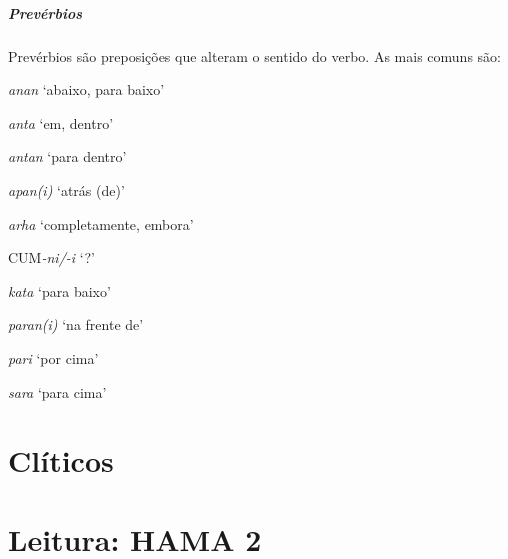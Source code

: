 \paragraph{Prevérbios}
Prevérbios são preposições que alteram o sentido do verbo.
As mais comuns são:
\begin{compactenum}[(a)]
\item *\emph{anan} `abaixo, para baixo'
\item \emph{anta} `em, dentro'
\item \emph{antan} `para dentro'
\item \emph{apan{(i)}} `atrás (de)'
\item \emph{arha} `completamente, embora'
\item CUM\emph{-ni/-i} `?'
\item *\emph{kata} `para baixo'
\item \emph{paran{(i)}} `na frente de'
\item \emph{pari} `por cima'
\item \emph{sara} `para cima'
\end{compactenum}
	 
\chapter{Clíticos}

\chapter{Leitura: HAMA 2}
